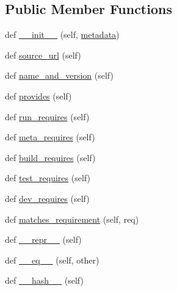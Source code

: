 \subsection*{Public Member Functions}
\begin{DoxyCompactItemize}
\item 
def \hyperlink{classpip_1_1__vendor_1_1distlib_1_1database_1_1Distribution_a124c19230779ed30c9a91fb547b54d4d}{\+\_\+\+\_\+init\+\_\+\+\_\+} (self, \hyperlink{classpip_1_1__vendor_1_1distlib_1_1database_1_1Distribution_adda9f0db4ba50d2a3b8dd421e576fb79}{metadata})
\item 
def \hyperlink{classpip_1_1__vendor_1_1distlib_1_1database_1_1Distribution_a16f9bfb2924ff71257f9a7271a11ec27}{source\+\_\+url} (self)
\item 
def \hyperlink{classpip_1_1__vendor_1_1distlib_1_1database_1_1Distribution_ab210e50a47614e15e92095ff48494ecb}{name\+\_\+and\+\_\+version} (self)
\item 
def \hyperlink{classpip_1_1__vendor_1_1distlib_1_1database_1_1Distribution_ad0360a56aa60642fe4faaad96b04d31c}{provides} (self)
\item 
def \hyperlink{classpip_1_1__vendor_1_1distlib_1_1database_1_1Distribution_a2daa3e8de219e45ee9bcaa1aed084930}{run\+\_\+requires} (self)
\item 
def \hyperlink{classpip_1_1__vendor_1_1distlib_1_1database_1_1Distribution_ad77fb27870e5e35e2550960b13586ed4}{meta\+\_\+requires} (self)
\item 
def \hyperlink{classpip_1_1__vendor_1_1distlib_1_1database_1_1Distribution_ac6964b7e3dd21322072ad0623cf08be6}{build\+\_\+requires} (self)
\item 
def \hyperlink{classpip_1_1__vendor_1_1distlib_1_1database_1_1Distribution_a6b2bf786c4358b542a9a960d3699e187}{test\+\_\+requires} (self)
\item 
def \hyperlink{classpip_1_1__vendor_1_1distlib_1_1database_1_1Distribution_a2efd10275a91dc09554bd6fdaf544be4}{dev\+\_\+requires} (self)
\item 
def \hyperlink{classpip_1_1__vendor_1_1distlib_1_1database_1_1Distribution_abbf012cffa73aca628104d1503cdf8e0}{matches\+\_\+requirement} (self, req)
\item 
def \hyperlink{classpip_1_1__vendor_1_1distlib_1_1database_1_1Distribution_af00ef8a7ccecfae5f9d83270abcece82}{\+\_\+\+\_\+repr\+\_\+\+\_\+} (self)
\item 
def \hyperlink{classpip_1_1__vendor_1_1distlib_1_1database_1_1Distribution_adf6c18bb0fe48b0f4b4a5d0a309d5afd}{\+\_\+\+\_\+eq\+\_\+\+\_\+} (self, other)
\item 
def \hyperlink{classpip_1_1__vendor_1_1distlib_1_1database_1_1Distribution_ad5de1f29a4c3937a0492ee9459c99f94}{\+\_\+\+\_\+hash\+\_\+\+\_\+} (self)
\end{DoxyCompactItemize}

